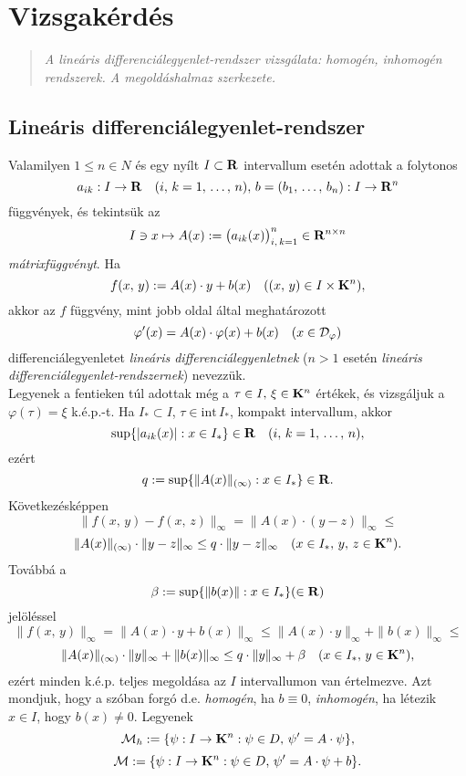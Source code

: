 \newpage
\section{Vizsgakérdés}
\begin{quote}
	\textit{A lineáris differenciálegyenlet-rendszer vizsgálata: homogén, inhomogén rendszerek. A megoldáshalmaz szerkezete.}
\end{quote}

\subsection{Lineáris differenciálegyenlet-rendszer}
Valamilyen $1 \leq n \in N$ és egy nyílt $I \subset \mathbf{R}$ intervallum esetén adottak a folytonos
\[
a_{ik} : I \to \mathbf{R} \quad (i, \, k = 1, \, \dots, \, n), \, b = (b_1, \, \dots, \, b_n) : I \to \mathbf{R}^n
\]
függvények, és tekintsük az
\[
I \ni x \mapsto A(x) := \big( a_{ik}(x) \big)_{i, \, k =1}^n \in \mathbf{R}^{n \times n}
\]
\textit{mátrixfüggvényt}. Ha
\[
f(x, \, y) := A(x) \cdot y + b(x) \quad ((x, \, y) \in I \times \mathbf{K}^n),
\]
akkor az $f$ függvény, mint jobb oldal által meghatározott
\[
\varphi'(x) = A(x) \cdot \varphi(x) + b(x) \quad (x \in \mathcal{D}_\varphi)
\]
differenciálegyenletet \textit{lineáris differenciálegyenletnek} ($n > 1$ esetén \textit{lineáris} \textit{differenciálegyenlet-rendszernek}) nevezzük.\\

Legyenek a fentieken túl adottak még a $\tau \in I, \, \xi \in \mathbf{K}^n$ értékek, és vizsgáljuk a $\varphi(\tau) = \xi$ k.é.p.-t. Ha $I_* \subset I$, $\tau \in \text{int} \, I_*$, kompakt intervallum, akkor
\[
\sup \{ |a_{ik}(x)| : x \in I_* \} \in \mathbf{R} \quad (i, \, k = 1, \, \dots, \, n),
\]
ezért
\[
q := \sup \{ \|A(x)\|_{(\infty)} : x \in I_* \} \in \mathbf{R}.
\]
Következésképpen
\[
\| f(x, \, y) - f(x, \, z) \|_\infty = \| A(x) \cdot (y- z) \|_\infty \leq
\]
\[
\|A(x)\|_{(\infty)} \cdot \|y-z\|_\infty \leq q \cdot \|y-z\|_\infty \quad (x \in I_*, \, y, \, z \in \mathbf{K}^n).
\]
Továbbá a
\[
\beta := \sup\{\|b(x)\| : x \in I_*\} (\in \mathbf{R})
\]
jelöléssel
\[
\|f(x, \, y)\|_\infty = \| A(x) \cdot y + b(x) \|_\infty \leq \|A(x) \cdot y\|_\infty + \|b(x)\|_\infty \leq
\]
\[
\|A(x)\|_{(\infty)} \cdot \|y\|_\infty + \|b(x)\|_\infty \leq q \cdot \|y\|_\infty + \beta \quad (x \in I_*, \, y \in \mathbf{K}^n),
\]
ezért minden k.é.p. teljes megoldása az $I$ intervallumon van értelmezve. Azt mondjuk, hogy a szóban forgó d.e. \textit{homogén}, ha $b \equiv 0$, \textit{inhomogén}, ha létezik $x \in I$, hogy $b(x) \neq 0$. Legyenek
\[
\mathcal{M}_h := \{ \psi : I \to \mathbf{K}^n : \psi \in D, \, \psi' = A \cdot \psi \},
\]
\[
\mathcal{M} := \{ \psi : I \to \mathbf{K}^n : \psi \in D, \, \psi' = A \cdot \psi + b\}.
\]

